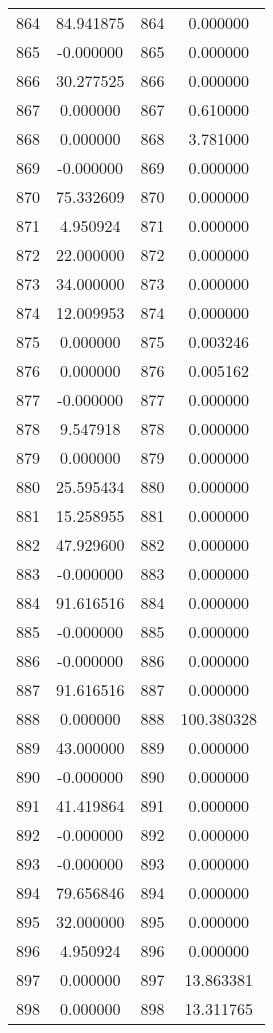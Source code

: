 \documentclass[12pt]{article}
\begin{document}
\begin{longtable}{@{}cccc@{}}
864 & 84.941875 & 864 & 0.000000 \\
865 & -0.000000 & 865 & 0.000000 \\
866 & 30.277525 & 866 & 0.000000 \\
867 & 0.000000 & 867 & 0.610000 \\
868 & 0.000000 & 868 & 3.781000 \\
869 & -0.000000 & 869 & 0.000000 \\
870 & 75.332609 & 870 & 0.000000 \\
871 & 4.950924 & 871 & 0.000000 \\
872 & 22.000000 & 872 & 0.000000 \\
873 & 34.000000 & 873 & 0.000000 \\
874 & 12.009953 & 874 & 0.000000 \\
875 & 0.000000 & 875 & 0.003246 \\
876 & 0.000000 & 876 & 0.005162 \\
877 & -0.000000 & 877 & 0.000000 \\
878 & 9.547918 & 878 & 0.000000 \\
879 & 0.000000 & 879 & 0.000000 \\
880 & 25.595434 & 880 & 0.000000 \\
881 & 15.258955 & 881 & 0.000000 \\
882 & 47.929600 & 882 & 0.000000 \\
883 & -0.000000 & 883 & 0.000000 \\
884 & 91.616516 & 884 & 0.000000 \\
885 & -0.000000 & 885 & 0.000000 \\
886 & -0.000000 & 886 & 0.000000 \\
887 & 91.616516 & 887 & 0.000000 \\
888 & 0.000000 & 888 & 100.380328 \\
889 & 43.000000 & 889 & 0.000000 \\
890 & -0.000000 & 890 & 0.000000 \\
891 & 41.419864 & 891 & 0.000000 \\
892 & -0.000000 & 892 & 0.000000 \\
893 & -0.000000 & 893 & 0.000000 \\
894 & 79.656846 & 894 & 0.000000 \\
895 & 32.000000 & 895 & 0.000000 \\
896 & 4.950924 & 896 & 0.000000 \\
897 & 0.000000 & 897 & 13.863381 \\
898 & 0.000000 & 898 & 13.311765 \\

\end{longtable}
\end{document}
